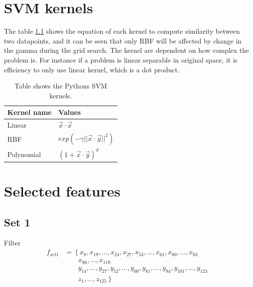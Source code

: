 \documentclass[USenglish]{ifimaster}  %
\begin{document}
\chapter{SVM kernels} \label{ap:kernel}
The table \ref{aptab:kern} shows the equation of each kernel to compute similarity between two datapoints, and it can be seen that only RBF will be affected by change in the gamma during the grid search. The kernel are dependent on how complex the problem is.  For instance if a problem is linear separable in original space, it is efficiency to only use linear kernel, which is a dot product.

\begin{table}[h]
	\centering
	\begin{tabular}{ll}
		\hline
		\textbf{Kernel name} & \textbf{Values} \\ \hline
		\multirow{2}{*}{Linear} & \multirow{2}{*}{$\vec{x} \cdot \vec{x}$} \\
		&  \\
		\multirow{2}{*}{RBF} & \multirow{2}{*}{$exp(-\gamma\vert\vert \vec{x}\cdot\vec{y}\vert\vert^{2})$} \\
		&  \\
		Polynomial & $(1 + \vec{x} \cdot \vec{y})^{d}$  \\ \hline
	\end{tabular}
	\caption{Table shows the Pythons SVM kernels.}
	\label{aptab:kern}
\end{table}
\FloatBarrier

\chapter{Selected features} \label{ap:self}
\section{Set 1}
Filter
\begin{align}
f_{set1} &= \left\{ x_{8}, x_{19},\dotsc, x_{24}, x_{27},  x_{53}, \dotsc, x_{61}, x_{80}, \dotsc, x_{83}\right.\nonumber\\
&\qquad \left. {}  x_{86},\dotsc,x_{119} \right.\nonumber\\
&\qquad \left. {}  y_{14},\dotsc,  y_{27}, y_{52}, \dotsc, y_{60}, y_{81},\dotsc, y_{84}, y_{101}, \dotsc, y_{123} \right.\nonumber\\
&\qquad \left. {} z_{1},\dotsc,z_{125} \right\}
\end{align}
\end{document}
